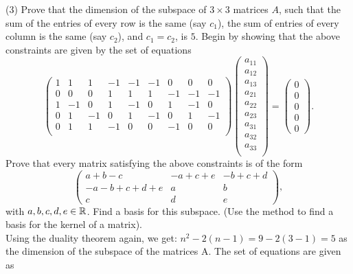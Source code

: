 \documentclass[12pt]{article}
\begin{document}
\medskip
(3)
Prove that the dimension of the subspace of $3\times 3$ matrices
$A$, such that the sum of the entries of every row is the same (say $c_1$),
the sum of entries of every column is the same (say $c_2$), and $c_1 =
c_2$, is  $5$. Begin by showing that the above constraints are given by
the set of equations
\[
\begin{pmatrix}
1 & 1 &  1 &  -1 & -1  & -1 & 0 & 0 & 0\\
0  &  0  &  0 & 1 & 1 &  1 &  -1 & -1  & -1  \\
1  &  -1  &  0 & 1 & -1  &  0 &  1 &  -1  &  0 \\
0  &  1  &  -1 & 0 &  1  &  -1 &  0 &  1  &  -1 \\
0  &  1  &  1 & -1 &  0  &  0 &  -1 &  0  &  0 \\
\end{pmatrix}
\begin{pmatrix}
a_{1 1} \\
a_{1 2} \\
a_{1 3} \\
a_{2 1} \\
a_{2 2 }  \\
a_{2 3 }  \\
a_{3 1 }  \\
a_{3 2 }  \\
a_{3 3 }  \\
\end{pmatrix}
=
\begin{pmatrix}
0\\
0\\
0\\
0\\
0
\end{pmatrix} .
\]
Prove that every  matrix satisfying the above constraints is of the form
\[
\begin{pmatrix}
a + b - c   & -a + c + e & -b + c + d  \\
-a -b + c + d + e & a    & b  \\
c  & d  & e 
\end{pmatrix},
\]
with $a, b, c, d, e\in {\mathbb R}$.
Find a basis for this subspace. (Use the method to find a basis for the
kernel of a matrix).\\

Using the duality theorem again, we get: $n^2 - 2(n -1) = 9 - 2(3 -1) = 5$ as the dimension of the subspace of the matrices A. The set of equations are given as 
\end{document}
